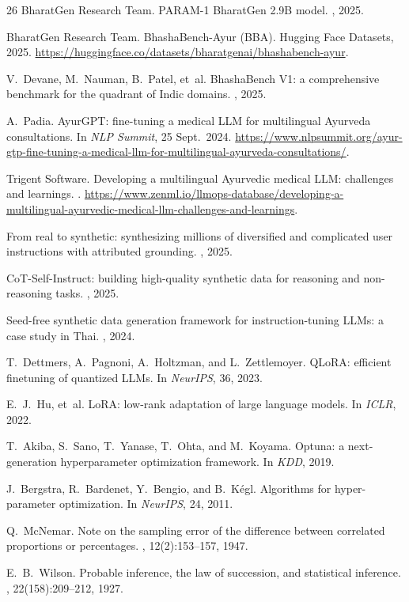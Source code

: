 \documentclass[10pt,twocolumn,letterpaper]{article}
\begin{document}
{\begin{thebibliography}{26}
BharatGen Research Team.
\newblock PARAM-1 BharatGen 2.9B model.
, 2025.

BharatGen Research Team.
\newblock BhashaBench-Ayur (BBA).
\newblock Hugging Face Datasets, 2025.
\newblock \url{https://huggingface.co/datasets/bharatgenai/bhashabench-ayur}.

V.~Devane, M.~Nauman, B.~Patel, et~al.
\newblock BhashaBench V1: a comprehensive benchmark for the quadrant of Indic domains.
, 2025.

A.~Padia.
\newblock AyurGPT: fine-tuning a medical LLM for multilingual Ayurveda consultations.
\newblock In {\em NLP Summit}, 25 Sept.\ 2024.
\newblock \url{https://www.nlpsummit.org/ayur-gtp-fine-tuning-a-medical-llm-for-multilingual-ayurveda-consultations/}.

Trigent Software.
\newblock Developing a multilingual Ayurvedic medical LLM: challenges and learnings.
.
\newblock \url{https://www.zenml.io/llmops-database/developing-a-multilingual-ayurvedic-medical-llm-challenges-and-learnings}.

From real to synthetic: synthesizing millions of diversified and complicated user instructions with attributed grounding.
, 2025.

CoT-Self-Instruct: building high-quality synthetic data for reasoning and non-reasoning tasks.
, 2025.

Seed-free synthetic data generation framework for instruction-tuning LLMs: a case study in Thai.
, 2024.

T.~Dettmers, A.~Pagnoni, A.~Holtzman, and L.~Zettlemoyer.
\newblock QLoRA: efficient finetuning of quantized LLMs.
\newblock In {\em NeurIPS}, 36, 2023.

E.~J.~Hu, et~al.
\newblock LoRA: low-rank adaptation of large language models.
\newblock In {\em ICLR}, 2022.

T.~Akiba, S.~Sano, T.~Yanase, T.~Ohta, and M.~Koyama.
\newblock Optuna: a next-generation hyperparameter optimization framework.
\newblock In {\em KDD}, 2019.

J.~Bergstra, R.~Bardenet, Y.~Bengio, and B.~K{\'e}gl.
\newblock Algorithms for hyper-parameter optimization.
\newblock In {\em NeurIPS}, 24, 2011.

Q.~McNemar.
\newblock Note on the sampling error of the difference between correlated proportions or percentages.
, 12(2):153--157, 1947.

E.~B.~Wilson.
\newblock Probable inference, the law of succession, and statistical inference.
, 22(158):209--212, 1927.

\end{thebibliography}
}
\end{document}
